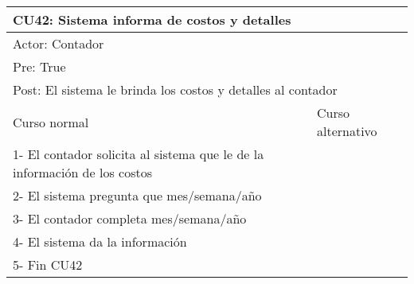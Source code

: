 \begin{table}[H]
  \begin{adjustbox}{max width = \textwidth}
  \begin{tabular}{|l|l|}
    \hline
    \multicolumn{2}{|l|}{CU42: Sistema informa de costos y detalles} \\\hline
    \multicolumn{2}{|l|}{Actor: Contador} \\\hline
    \multicolumn{2}{|l|}{Pre: True} \\\hline
    \multicolumn{2}{|l|}{Post: El sistema le brinda los costos y detalles al contador} \\\hline
     Curso normal & Curso alternativo\\ \hline
     1- El contador solicita al sistema que le de la información de los costos & \\ \hline
     2- El sistema pregunta que mes/semana/año & \\ \hline
     3- El contador completa mes/semana/año & \\ \hline
     4- El sistema da la información & \\ \hline
	 5- Fin CU42 & \\ \hline
  \end{tabular}
  \end{adjustbox}
\end{table}
